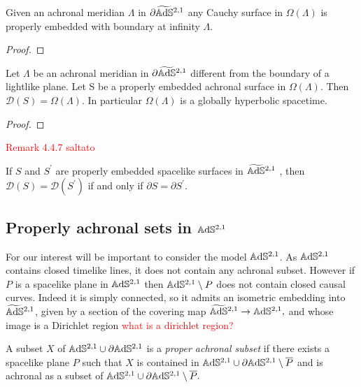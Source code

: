 \begin{lemma}
    Given an achronal meridian $\Lambda$ in $\partial\widetilde{\mathbb{A}\mathrm{d}\mathbb{S}}{}^{2,1}$ any Cauchy surface in $\Omega(\Lambda)$ is properly embedded with boundary at infinity $\Lambda$. 
\end{lemma}
\begin{proof}
    
\end{proof}

\begin{proposition}
    Let $\Lambda$ be an achronal meridian in $\partial\widetilde{\mathbb{A}\mathrm{d}\mathbb{S}}{}^{2,1}$ different from the boundary of a lightlike plane. Let S be a properly embedded achronal surface in $\Omega(\Lambda)$. Then $\mathcal{D}(S)=\Omega(\Lambda)$. In particular $\Omega(\Lambda)$ is a globally hyperbolic spacetime.
\end{proposition}
\begin{proof}
    
\end{proof}


\textcolor{red}{Remark 4.4.7 saltato}

\begin{corollary}
    If $S$ and $S^{\prime}$ are properly embedded spacelike surfaces in $\widetilde{\mathbb{A}\mathrm{d}\mathbb{S}}{}^{2,1}$ , then $\mathcal{D}(S)=\mathcal{D}(S^{\prime})$ if and only if $\partial S=\partial S^{\prime}$.
\end{corollary}

\subsection{Properly achronal sets in $\mathbb{A}\mathrm{d}\mathbb{S}^{2,1}$}
For our interest will be important to consider the model $\mathbb{A}\mathrm{d}\mathbb{S}^{2,1}$. As $\mathbb{A}\mathrm{d}\mathbb{S}^{2,1}$ contains closed timelike lines, it does not contain any achronal subset. However if $P$ is a spacelike plane in $\mathbb{A}\mathrm{d}\mathbb{S}^{2,1}$ then $\mathbb{A}\mathrm{d}\mathbb{S}^{2,1}\setminus P$ does not contain closed causal curves. Indeed it is simply connected, so it admits an isometric embedding into $\widetilde{\mathbb{A}\mathrm{d}\mathbb{S}}{}^{2,1}$, given by a section of the covering map $\widetilde{\mathbb{A}\mathrm{d}\mathbb{S}}{}^{2,1}\to\mathbb{A}\mathrm{d}\mathbb{S}^{2,1},$ and whose image is a Dirichlet region \textcolor{red}{what is a dirichlet region?}

\begin{definition}
    A subset $X$ of $\mathbb{A}\mathrm{d}\mathbb{S}^{2,1}\cup\partial\mathbb{A}\mathrm{d}\mathbb{S}^{2,1}$ is a \textit{proper achronal subset} if there exists a spacelike plane $P$ such that $X$ is contained in $\mathbb{A}\mathrm{d}\mathbb{S}^{2,1}\cup\partial\mathbb{A}\mathrm{d}\mathbb{S}^{2,1}\setminus\overline{P}$ and is achronal as a subset of $\mathbb{A}\mathrm{d}\mathbb{S}^{2,1}\cup\partial\mathbb{A}\mathrm{d}\mathbb{S}^{2,1}\setminus\overline{P}.$  
\end{definition}

